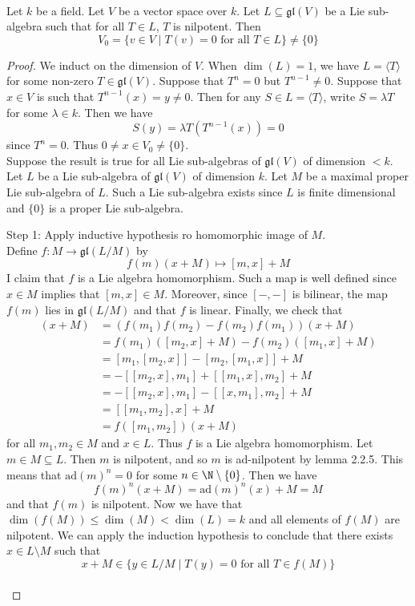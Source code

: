 \documentclass[a4paper]{article}
\begin{document}
\begin{prp}{}{} \\Let $k$ be a field. Let $V$ be a vector space over $k$. Let $L\subseteq\mathfrak{gl}(V)$ be a Lie sub-algebra such that for all $T\in L$, $T$ is nilpotent. Then $$V_0=\{v\in V\;|\;T(v)=0\text{ for all }T\in L\}\neq\{0\}$$ 
\begin{proof}
We induct on the dimension of $V$. When $\dim(L)=1$, we have $L=\langle T\rangle$ for some non-zero $T\in\mathfrak{gl}(V)$. Suppose that $T^n=0$ but $T^{n-1}\neq 0$. Suppose that $x\in V$ is such that $T^{n-1}(x)=y\neq 0$. Then for any $S\in L=\langle T\rangle$, write $S=\lambda T$ for some $\lambda\in k$. Then we have $$S(y)=\lambda T(T^{n-1}(x))=0$$ since $T^n=0$. Thus $0\neq x\in V_0\neq\{0\}$. \\

Suppose the result is true for all Lie sub-algebras of $\mathfrak{gl}(V)$ of dimension $<k$. Let $L$ be a Lie sub-algebra of $\mathfrak{gl}(V)$ of dimension $k$. Let $M$ be a maximal proper Lie sub-algebra of $L$. Such a Lie sub-algebra exists since $L$ is finite dimensional and $\{0\}$ is a proper Lie sub-algebra. 

Step 1: Apply inductive hypothesis ro homomorphic image of $M$. \\
Define $f:M\to\mathfrak{gl}(L/M)$ by $$f(m)(x+M)\mapsto[m,x]+M$$ I claim that $f$ is a Lie algebra homomorphism. Such a map is well defined since $x\in M$ implies that $[m,x]\in M$. Moreover, since $[-,-]$ is bilinear, the map $f(m)$ lies in $\mathfrak{gl}(L/M)$ and that $f$ is linear. Finally, we check that 
\begin{align*}
[f(m_1),f(m_2)](x+M)&=(f(m_1)f(m_2)-f(m_2)f(m_1))(x+M)\\
&=f(m_1)([m_2,x]+M)-f(m_2)([m_1,x]+M)\\
&=[m_1,[m_2,x]]-[m_2,[m_1,x]]+M\\
&=-[[m_2,x],m_1]+[[m_1,x],m_2]+M\\
&=-[[m_2,x],m_1]-[[x,m_1],m_2]+M\\
&=[[m_1,m_2],x]+M\tag{Jacobi Identity}\\
&=f([m_1,m_2])(x+M)
\end{align*}
for all $m_1,m_2\in M$ and $x\in L$. Thus $f$ is a Lie algebra homomorphism.  Let $m\in M\subseteq L$. Then $m$ is nilpotent, and so $m$ is ad-nilpotent by lemma 2.2.5. This means that $\text{ad}(m)^n=0$ for some $n\in\N\setminus\{0\}$. Then we have $$f(m)^n(x+M)=\text{ad}(m)^n(x)+M=M$$ and that $f(m)$ is nilpotent. Now we have that $\dim(f(M))\leq\dim(M)<\dim(L)=k$ and all elements of $f(M)$ are nilpotent. We can apply the induction hypothesis to conclude that there exists $x\in L\setminus M$ such that $$x+M\in\{y\in L/M\;|\;T(y)=0\text{ for all }T\in f(M)\}$$~\\


\end{proof}
\end{prp}
\end{document}
